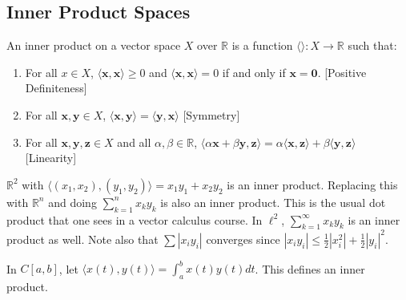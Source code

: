     \subsection{Inner Product Spaces}
        \begin{definition}
            An inner product on a vector space
            $X$ over $\mathbb{R}$ is a function
            $\langle\rangle:X\rightarrow\mathbb{R}$
            such that:
            \begin{enumerate}
                \item For all $x\in{X}$,
                      $\langle{\mathbf{x},\mathbf{x}}%
                       \rangle\geq{0}$
                      and
                      $\langle\mathbf{x},\mathbf{x}\rangle=0$
                      if and only
                      if $\mathbf{x}=\mathbf{0}$.
                      \hfill[Positive Definiteness]
                \item For all $\mathbf{x},\mathbf{y}\in{X}$,
                      $\langle\mathbf{x},\mathbf{y}\rangle%
                       =\langle\mathbf{y},\mathbf{x}\rangle$
                      \hfill[Symmetry]
                \item For all
                      $\mathbf{x},\mathbf{y},\mathbf{z}%
                       \in{X}$
                      and all $\alpha,\beta\in\mathbb{R}$,
                      $\langle\alpha\mathbf{x}%
                       +\beta\mathbf{y},\mathbf{z}\rangle%
                       =\alpha\langle\mathbf{x},\mathbf{z}%
                       \rangle+\beta\langle\mathbf{y},%
                       \mathbf{z}\rangle$
                      \hfill[Linearity]
            \end{enumerate}
        \end{definition}
        \begin{example}
            $\mathbb{R}^{2}$ with
            $\langle(x_{1},x_{2}),(y_{1},y_{2})\rangle%
             =x_{1}y_{1}+x_{2}y_{2}$ is an inner product.
            Replacing this with $\mathbb{R}^{n}$ and doing
            $\sum_{k=1}^{n}x_{k}y_{k}$ is also an inner
            product. This is the usual dot product that one
            sees in a vector calculus course. In $\ell^{2}$,
            $\sum_{k=1}^{\infty}x_{k}y_{k}$ is an inner
            product as well. Note also that
            $\sum|x_{i}y_{i}|$ converges since
            $|x_{i}y_{i}|\leq\frac{1}{2}|x_{i}^{2}|%
             +\frac{1}{2}|y_{i}|^{2}$.
        \end{example}
        \begin{example}
            In $C[a,b]$, let
            $\langle{x(t),y(t)}\rangle%
             =\int_{a}^{b}x(t)y(t)dt$. This defines an
            inner product.
        \end{example}
